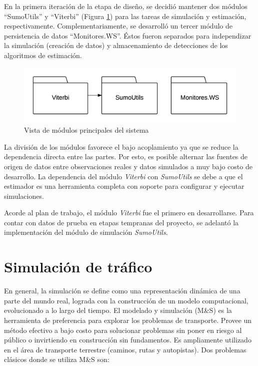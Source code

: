 En la primera iteración de la etapa de diseño, se decidió mantener dos módulos ``SumoUtils'' y ``Viterbi''  (Figura \ref{fig:modulos-gral}) para las tareas de simulación y estimación, respectivamente. Complementariamente, se desarrolló un tercer módulo de persistencia de datos ``Monitores.WS''. Éstos fueron separados para independizar la simulación (creación de datos) y almacenamiento de detecciones de los algoritmos de estimación. 

\begin{figure}[!htp]
	\centering
	\includegraphics[scale=0.8]{images/modulos-gral.png}
	\caption{Vista de módulos principales del sistema}
    \label{fig:modulos-gral}
\end{figure}

La división de los módulos favorece el bajo acoplamiento ya que se reduce la dependencia directa entre las partes. Por esto, es posible alternar las fuentes de origen de datos entre observaciones reales y datos simulados a muy bajo costo de desarrollo. La dependencia del módulo \textit{Viterbi} con \textit{SumoUtils} se debe a que el estimador es una herramienta completa con soporte para configurar y ejecutar simulaciones.

Acorde al plan de trabajo, el módulo \textit{Viterbi} fue el primero en desarrollarse. Para contar con datos de prueba en etapas tempranas del proyecto, se adelantó la implementación del módulo de simulación \textit{SumoUtils}.  

\section{Simulación de tráfico}

En general, la simulación se define como una representación dinámica de una parte del mundo real, lograda con la construcción de un modelo computacional, evolucionado a lo largo del tiempo. El modelado y simulación (M\&S) es la herramienta de preferencia para explorar los problemas de transporte\cite{sokolowski2011principles}. Provee un método efectivo a bajo costo para solucionar problemas sin poner en riesgo al público o invirtiendo en construcción sin fundamentos. Es ampliamente utilizado en el área de transporte terrestre (caminos, rutas y autopistas). Dos problemas clásicos donde se utiliza M\&S son:


